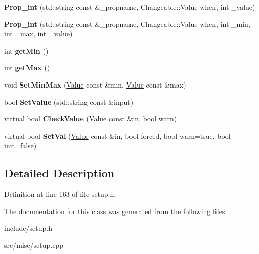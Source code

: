\begin{DoxyCompactItemize}
\item 
\hypertarget{classProp__int_ab8c1f3f50ceaf2e36e3aab48253d2250}{{\bfseries Prop\-\_\-int} (std\-::string const \&\-\_\-propname, Changeable\-::\-Value when, int \-\_\-value)}\label{classProp__int_ab8c1f3f50ceaf2e36e3aab48253d2250}

\item 
\hypertarget{classProp__int_ac60562cfca6336553db06cf561819bb7}{{\bfseries Prop\-\_\-int} (std\-::string const \&\-\_\-propname, Changeable\-::\-Value when, int \-\_\-min, int \-\_\-max, int \-\_\-value)}\label{classProp__int_ac60562cfca6336553db06cf561819bb7}

\item 
\hypertarget{classProp__int_aad26bd6a145d1ca391951ae4b15e625d}{int {\bfseries get\-Min} ()}\label{classProp__int_aad26bd6a145d1ca391951ae4b15e625d}

\item 
\hypertarget{classProp__int_ac2c53ae3bfb50553e3dc518c19df83db}{int {\bfseries get\-Max} ()}\label{classProp__int_ac2c53ae3bfb50553e3dc518c19df83db}

\item 
\hypertarget{classProp__int_a5ddfd86051b921d5102fa76649bc145a}{void {\bfseries Set\-Min\-Max} (\hyperlink{classValue}{Value} const \&min, \hyperlink{classValue}{Value} const \&max)}\label{classProp__int_a5ddfd86051b921d5102fa76649bc145a}

\item 
\hypertarget{classProp__int_a3db72fc1004d43095fe181f437e3e9e6}{bool {\bfseries Set\-Value} (std\-::string const \&input)}\label{classProp__int_a3db72fc1004d43095fe181f437e3e9e6}

\item 
\hypertarget{classProp__int_a083e5487ae2544d805324fe8b0d3bc7d}{virtual bool {\bfseries Check\-Value} (\hyperlink{classValue}{Value} const \&in, bool warn)}\label{classProp__int_a083e5487ae2544d805324fe8b0d3bc7d}

\item 
\hypertarget{classProp__int_abd27dc79ac34b59f121f98214f613fb2}{virtual bool {\bfseries Set\-Val} (\hyperlink{classValue}{Value} const \&in, bool forced, bool warn=true, bool init=false)}\label{classProp__int_abd27dc79ac34b59f121f98214f613fb2}

\end{DoxyCompactItemize}


\subsection{Detailed Description}


Definition at line 163 of file setup.\-h.



The documentation for this class was generated from the following files\-:\begin{DoxyCompactItemize}
\item 
include/setup.\-h\item 
src/misc/setup.\-cpp\end{DoxyCompactItemize}
